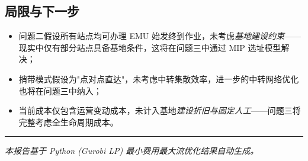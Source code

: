 \documentclass[12pt,a4paper,fontset=none]{ctexart}
\begin{document}
\subsection{局限与下一步}

\begin{itemize}
    \item 问题二假设所有站点均可办理 EMU 始发终到作业，未考虑\emph{基地建设约束}——现实中仅有部分站点具备基地条件，这将在问题三中通过 MIP 选址模型解决；
    \item 捎带模式假设为"点对点直达"，未考虑中转集散效率，进一步的中转网络优化也将在问题三中纳入；
    \item 当前成本仅包含运营变动成本，未计入基地\emph{建设折旧与固定人工}——问题三将完整考虑全生命周期成本。
\end{itemize}

\vspace{12pt}
\noindent\rule{\textwidth}{0.5pt}
\vspace{6pt}

\begin{center}
\small\textit{本报告基于 Python (Gurobi LP) 最小费用最大流优化结果自动生成。}
\end{center}
\end{document}
